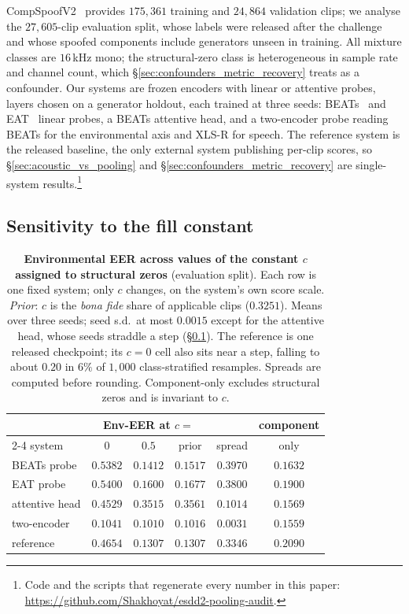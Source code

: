 \documentclass{article}
\begin{document}
CompSpoofV2~\cite{compspoof2026,esdd2} provides $175{,}361$ training and $24{,}864$ validation clips; we analyse the $27{,}605$-clip evaluation split, whose labels were released after the challenge and whose spoofed components include generators unseen in training. All mixture classes are $16$\,kHz mono; the structural-zero class is heterogeneous in sample rate and channel count, which \S\ref{sec:confounders_metric_recovery} treats as a confounder. Our systems are frozen encoders with linear or attentive probes, layers chosen on a generator holdout, each trained at three seeds: BEATs~\cite{chen2023beats} and EAT~\cite{chen2024eat} linear probes, a BEATs attentive head, and a two-encoder probe reading BEATs for the environmental axis and XLS-R for speech. The reference system is the released baseline, the only external system publishing per-clip scores, so \S\ref{sec:acoustic_vs_pooling} and \S\ref{sec:confounders_metric_recovery} are single-system results.\footnote{\label{fn:code}Code and the scripts that regenerate every number in this paper: \url{https://github.com/Shakhoyat/esdd2-pooling-audit}.}

\subsection{Sensitivity to the fill constant}
\label{sec:convention_sensitivity}

\begin{table}[t]
\centering
\caption{\textbf{Environmental EER across values of the constant $c$ assigned to structural zeros} (evaluation split). Each row is one fixed system; only $c$ changes, on the system's own score scale. \emph{Prior}: $c$ is the \emph{bona fide} share of applicable clips ($0.3251$). Means over three seeds; seed s.d.\ at most $0.0015$ except for the attentive head, whose seeds straddle a step (\S\ref{sec:convention_sensitivity}). The reference is one released checkpoint; its $c=0$ cell also sits near a step, falling to about $0.20$ in $6\%$ of $1{,}000$ class-stratified resamples. Spreads are computed before rounding. Component-only excludes structural zeros and is invariant to $c$.}
\label{tab:spread}
\vspace{3pt}
\setlength{\tabcolsep}{0pt}
\begin{tabular*}{\columnwidth}{@{\extracolsep{\fill}}lccccc@{}}
\toprule
 & \multicolumn{3}{c}{Env-EER at $c=$} & & component \\
\cmidrule(lr){2-4}
system & $0$ & $0.5$ & prior & spread & only \\
\midrule
BEATs probe    & $0.5382$ & $0.1412$ & $0.1517$ & $\mathbf{0.3970}$ & $0.1632$ \\
EAT probe      & $0.5400$ & $0.1600$ & $0.1677$ & $0.3800$ & $0.1900$ \\
attentive head & $0.4529$ & $0.3515$ & $0.3561$ & $0.1014$ & $0.1569$ \\
two-encoder    & $0.1041$ & $0.1010$ & $0.1016$ & $0.0031$ & $0.1559$ \\
reference      & $0.4654$ & $0.1307$ & $0.1307$ & $0.3346$ & $0.2090$ \\
\bottomrule
\end{tabular*}
\end{table}
\end{document}
